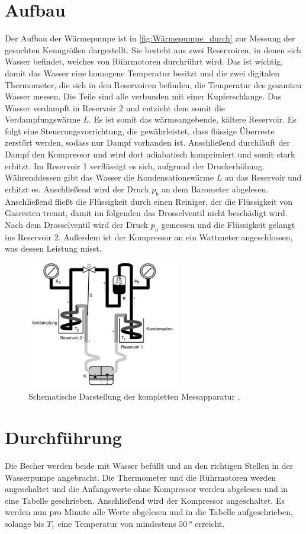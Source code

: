 \section{Aufbau}
\label{sec:Aufbau}
Der Aufbau der Wärmepumpe ist in \autoref{fig:Wärmepumpe_durch} zur Messung der gesuchten Kenngrößen dargestellt.
Sie besteht aus zwei Reservoiren, in denen sich Wasser befindet, welches von Rührmotoren durchrührt wird. 
Das ist wichtig, damit das Wasser eine homogene Temperatur besitzt und die zwei digitalen Thermometer, die sich in den Reservoiren befinden, die Temperatur des gesamten Wasser messen.
Die Teile sind alle verbunden mit einer Kupferschlange.
Das Wasser verdampft in Reservoir 2 und entzieht dem somit die Verdampfungswärme $L$.
Es ist somit das wärmeangebende, kältere Reservoir.
Es folgt eine Steuerungsvorrichtung, die gewährleistet, dass flüssige Überreste zerstört werden, sodass nur Dampf vorhanden ist.
Anschließend durchläuft der Dampf den Kompressor und wird dort adiabatisch komprimiert und somit stark erhitzt.
Im Reservoir 1 verflüssigt es sich, aufgrund der Druckerhöhung.
Währenddessen gibt das Wasser die Kondensationswärme $L$ an das Reservoir und erhitzt es.
Anschließend wird der Druck $p_b$ an dem Barometer abgelesen. 
Anschließend fließt die Flüssigkeit durch einen Reiniger, der die Flüssigkeit von Gasresten trennt, damit im folgenden das Drosselventil nicht beschädigt wird.
Nach dem Drosselventil wird der Druck $p_a$ gemessen und die Flüssigkeit gelangt ins Reservoir 2.
Außerdem ist der Kompressor an  ein Wattmeter angeschlossen, was dessen Leistung misst.
\begin{figure}[H]
    \centering
    \includegraphics[width=0.6\textwidth]{build/Abb1.png}
    \caption{Schematische Darstellung der kompletten Messapparatur \cite[197]{V206}.}
    \label{fig:Wärmepumpe_durch}
\end{figure}
\section{Durchführung}
\label{sec:Durchführung}
Die Becher werden beide mit Wasser befüllt und an den richtigen Stellen in der Wasserpumpe angebracht.
Die Thermometer und die Rührmotoren werden angeschaltet und die Anfangswerte ohne Kompressor werden abgelesen und in eine Tabelle geschrieben.
Anschließend wird der Kompressor angeschaltet.
Es werden nun pro Minute alle Werte abgelesen und in die Tabelle aufgeschrieben, solange bis $T_1$ eine Temperatur von mindestens $\qty{50}{\degree}$ erreicht.
